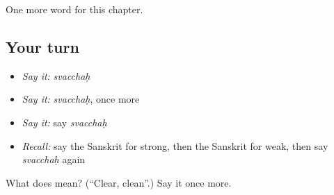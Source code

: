 \begin{grammarlens}[title={What you've built}]
One more word for this chapter.
\end{grammarlens}

\subsection*{Your turn}
\begin{itemize}
\raggedright
  \item \emph{Say it:} \emph{svacchaḥ}
  \item \emph{Say it:} \emph{svacchaḥ}, once more
  \item \emph{Say it:} say \emph{svacchaḥ}
  \item \emph{Recall:} say the Sanskrit for strong, then the Sanskrit for weak, then say \emph{svacchaḥ} again
\end{itemize}

\begin{tcolorbox}[breakable,colback=teal!4,colframe=teal!35!black,title={Before you move on}]
What does  mean? (\textquotedblleft{}Clear, clean\textquotedblright{}.) Say it once more.
\end{tcolorbox}
